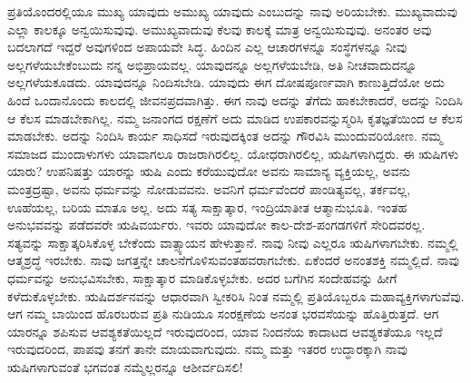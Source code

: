 ಪ್ರತಿಯೊಂದರಲ್ಲಿಯೂ ಮುಖ್ಯ ಯಾವುದು ಅಮುಖ್ಯ ಯಾವುದು ಎಂಬುದನ್ನು ನಾವು ಅರಿಯಬೇಕು. ಮುಖ್ಯವಾದುವು ಎಲ್ಲಾ ಕಾಲಕ್ಕೂ ಅನ್ವಯಿಸುವುವು. ಅಮುಖ್ಯವಾದುವು ಕೆಲವು ಕಾಲಕ್ಕೆ ಮಾತ್ರ ಅನ್ವಯಿಸುವುವು. ಅನಂತರ ಅವು ಬದಲಾಗದೆ ಇದ್ದರೆ ಅವುಗಳಿಂದ ಅಪಾಯವೇ ಸಿದ್ಧ. ಹಿಂದಿನ ಎಲ್ಲ ಆಚಾರಗಳನ್ನೂ ಸಂಸ್ಥೆಗಳನ್ನೂ ನೀವು ಅಲ್ಲಗಳೆಯಬೇಕೆಂಬುದು ನನ್ನ ಅಭಿಪ್ರಾಯವಲ್ಲ. ಯಾವುದನ್ನೂ ಅಲ್ಲಗಳೆಯಬೇಡಿ, ಅತಿ ನೀಚವಾದುದನ್ನೂ ಅಲ್ಲಗಳೆಯಕೂಡದು. ಯಾವುದನ್ನೂ ನಿಂದಿಸಬೇಡಿ. ಯಾವುದು ಈಗ ದೋಷಪೂರ್ಣವಾಗಿ ಕಾಣುತ್ತಿದೆಯೋ ಅದು ಹಿಂದೆ ಒಂದಾನೊಂದು ಕಾಲದಲ್ಲಿ ಜೀವನಪ್ರದವಾಗಿತ್ತು. ಈಗ ನಾವು ಅದನ್ನು ತೆಗೆದು ಹಾಕಬೇಕಾದರೆ, ಅದನ್ನು ನಿಂದಿಸಿ ಆ ಕೆಲಸ ಮಾಡಬೇಕಾಗಿಲ್ಲ. ನಮ್ಮ ಜನಾಂಗದ ರಕ್ಷಣೆಗೆ ಅದು ಮಾಡಿದ ಉಪಕಾರವನ್ನು\break ಸ್ಮರಿಸಿ ಕೃತಜ್ಞತೆಯಿಂದ ಆ ಕೆಲಸ ಮಾಡಬೇಕು. ಅದನ್ನು ನಿಂದಿಸಿ ಕಾರ್ಯ ಸಾಧಿಸದೆ ಇರುವುದಕ್ಕಿಂತ ಅದನ್ನು ಗೌರವಿಸಿ ಮುಂದುವರಿಯೋಣ. ನಮ್ಮ ಸಮಾಜದ ಮುಂದಾಳುಗಳು ಯಾವಾಗಲೂ ರಾಜರಾಗಿರಲಿಲ್ಲ. ಯೋಧರಾಗಿರಲಿಲ್ಲ, ಋಷಿಗಳಾಗಿದ್ದರು. ಈ ಋಷಿಗಳು ಯಾರು? ಉಪನಿಷತ್ತು ಯಾರನ್ನು ಋಷಿ ಎಂದು ಕರೆಯುವುದೋ ಅವನು ಸಾಮಾನ್ಯ ವ್ಯಕ್ತಿಯಲ್ಲ, ಅವನು ಮಂತ್ರದ್ರಷ್ಟಾ, ಅವನು ಧರ್ಮವನ್ನು ನೋಡುವವನು. ಅವನಿಗೆ ಧರ್ಮವೆಂದರೆ ಪಾಂಡಿತ್ಯವಲ್ಲ, ತರ್ಕವಲ್ಲ, ಊಹೆಯಲ್ಲ, ಬರಿಯ ಮಾತೂ ಅಲ್ಲ. ಅದು ಸತ್ಯ ಸಾಕ್ಷಾತ್ಕಾರ, ಇಂದ್ರಿಯಾತೀತ ಆತ್ಮಾನುಭೂತಿ. ಇಂತಹ ಅನುಭವವನ್ನು ಪಡೆದವರೇ ಋಷಿವರ್ಯರು. ಇವರು ಯಾವುದೋ ಕಾಲ-ದೇಶ-ಪಂಗಡಗಳಿಗೆ ಸೇರಿದವರಲ್ಲ. ಸತ್ಯವನ್ನು ಸಾಕ್ಷಾತ್ಕರಿಸಿಕೊಳ್ಳ ಬೇಕೆಂದು ವಾತ್ಸ್ಯಾಯನ ಹೇಳುತ್ತಾನೆ. ನಾವು ನೀವು ಎಲ್ಲರೂ ಋಷಿಗಳಾಗಬೇಕು. ನಮ್ಮಲ್ಲಿ ಆತ್ಮಶ್ರದ್ಧೆ ಇರಬೇಕು. ನಾವು ಜಗತ್ತನ್ನೇ ಚಾಲನೆಗೊಳಿಸುವಂತಹವರಾಗಬೇಕು. ಏಕೆಂದರೆ ಅನಂತಶಕ್ತಿ ನಮ್ಮಲ್ಲಿದೆ. ನಾವು ಧರ್ಮವನ್ನು ಅನುಭವಿಸಬೇಕು, ಸಾಕ್ಷಾತ್ಕಾರ ಮಾಡಿಕೊಳ್ಳಬೇಕು. ಅದರ ಬಗೆಗಿನ ಸಂದೇಹವನ್ನು ಹೀಗೆ ಕಳೆದುಕೊಳ್ಳಬೇಕು. ಋಷಿದರ್ಶನವನ್ನು ಆಧಾರವಾಗಿ ಸ್ವೀಕರಿಸಿ ನಿಂತ ನಮ್ಮಲ್ಲಿ ಪ್ರತಿಯೊಬ್ಬರೂ ಮಹಾವ್ಯಕ್ತಿಗಳಾಗುವೆವು. ಆಗ ನಮ್ಮ ಬಾಯಿಂದ ಹೊರಬರುವ ಪ್ರತಿ ನುಡಿಯೂ ಸಂರಕ್ಷಣೆಯ ಅನಂತ ಭರವಸೆಯನ್ನು ಹೊತ್ತಿರುತ್ತದೆ. ಆಗ ಯಾರನ್ನೂ ಶಪಿಸುವ ಆವಶ್ಯಕತೆಯಿಲ್ಲದೆ ಇರುವುದರಿಂದ, ಯಾವ ನಿಂದನೆಯ ಕಾದಾಟದ ಆವಶ್ಯ\-ಕತೆಯೂ ಇಲ್ಲದೆ ಇರುವುದರಿಂದ, ಪಾಪವು ತನಗೆ ತಾನೇ ಮಾಯವಾಗುವುದು. ನಮ್ಮ ಮತ್ತು ಇತರರ ಉದ್ಧಾರಕ್ಕಾಗಿ ನಾವು ಋಷಿಗಳಾಗುವಂತೆ ಭಗವಂತ ನಮ್ಮೆಲ್ಲರನ್ನೂ ಆಶೀರ್ವದಿಸಲಿ!

